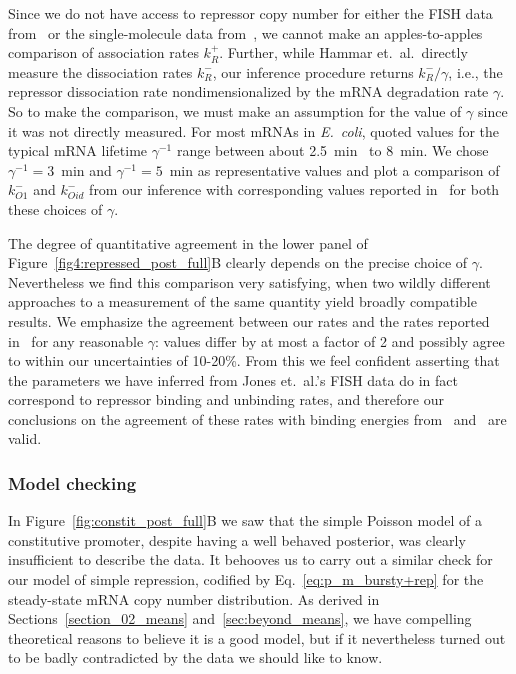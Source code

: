 Since we do not have access to repressor copy number for either
the FISH data from~\cite{Jones2014} or the single-molecule data
from~\cite{Hammar2014}, we cannot make an apples-to-apples
comparison of association rates $k_R^+$. Further, while Hammar
et.\ al.\ directly measure the dissociation rates $k_R^-$, our
inference procedure returns $k_R^-/\gamma$, i.e., the repressor
dissociation rate nondimensionalized by the mRNA degradation rate
$\gamma$. So to make the comparison, we must make an assumption
for the value of $\gamma$ since it was not directly measured. For
most mRNAs in \textit{E.\ coli}, quoted values for the typical mRNA
lifetime $\gamma^{-1}$ range between about 2.5~min~\cite{Chen2015}
to 8~min. We chose $\gamma^{-1} = 3$~min and $\gamma^{-1} =
5$~min as representative values and plot a comparison of
$k_{O1}^-$ and $k_{Oid}^-$ from our inference with corresponding values
reported in~\cite{Hammar2014} for both these choices of $\gamma$.

The degree of quantitative agreement in the lower panel of
Figure~\ref{fig4:repressed_post_full}B clearly depends on the
precise choice of $\gamma$. Nevertheless we find this comparison very satisfying, when two wildly different approaches to a measurement of the same quantity yield broadly compatible results. We emphasize the agreement between our rates
and the rates reported in~\cite{Hammar2014} for any reasonable
$\gamma$: values differ by at most a factor of 2 and possibly
agree to within our uncertainties of 10-20\%. From this we feel
confident asserting that the parameters we have inferred from
Jones et.\ al.'s FISH data do in fact correspond to repressor
binding and unbinding rates, and therefore our conclusions on the
agreement of these rates with binding energies
from~\cite{Garcia2011a} and~\cite{Razo-Mejia2018} are valid.

\subsubsection{Model checking}
In Figure~\ref{fig:constit_post_full}B we saw that the simple
Poisson model of a constitutive promoter, despite having a well
behaved posterior, was clearly insufficient to describe the data.
It behooves us to carry out a similar check for our model of
simple repression, codified by Eq.~\ref{eq:p_m_bursty+rep} for
the steady-state mRNA copy number distribution.
As derived in Sections~\ref{section_02_means}
and~\ref{sec:beyond_means}, we have compelling theoretical reasons
to believe it is a good model, but if it nevertheless turned out
to be badly contradicted by the data we should like to know.

